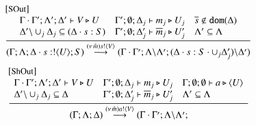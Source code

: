 \begin{figure}[t]
	\[
	\begin{array}{l}
		\eltsrule{SOut}\\
\tree{
			\begin{array}{lll}
			\Gamma \cat \Gamma'; \Lambda'; \Delta' \proves V \hastype U
&				
				\Gamma'; \es; \Delta_j \proves m_j  \hastype U_j
& 
				\dual{s} \notin \dom{\Delta}
\\
						\Delta'\backslash \cup_j \Delta_j \subseteq (\Delta \cat s: S)
& 
	\Gamma'; \es; \Delta_j' \proves \dual{m}_j  \hastype U_j'
& 
				\Lambda' \subseteq \Lambda
			\end{array}
		}{
			(\Gamma; \Lambda; \Delta \cat s: \btout{U} S) \by{\news{\tilde{m}} \bactout{s}{V}} (\Gamma \cat \Gamma'; \Lambda\backslash\Lambda';
			(\Delta \cat s: S \cat \cup_j \Delta_j') \backslash \Delta')
		}
\end{array}
\]
\[
\begin{array}{l}
\eltsrule{ShOut}\\
\tree{
		\begin{array}{lll}
			\Gamma \cat \Gamma' ; \Lambda'; \Delta' \proves V \hastype U &  
		\Gamma'; \es; \Delta_j \proves m_j \hastype U_j
& \Gamma ; \es ; \es \proves a \hastype \chtype{U}
				\\
			\Delta'\backslash \cup_j \Delta_j 
                         \subseteq \Delta
& 
		\Gamma'; \es; \Delta_j' \proves \dual{m}_j\hastype U_j'
& 
				\Lambda' \subseteq \Lambda
			\end{array}
		}{
			(\Gamma ; \Lambda; \Delta) \by{\news{\tilde{m}} \bactout{a}{V}} (\Gamma \cat \Gamma' ; \Lambda\backslash\Lambda';
}
\end{array}\]
\end{figure}
